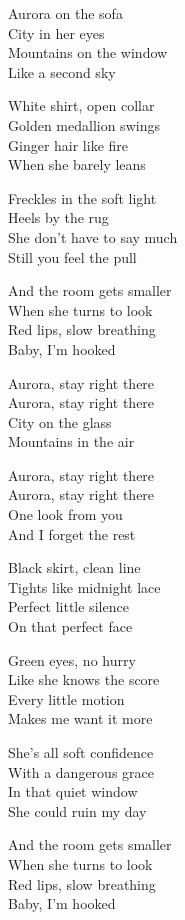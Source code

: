 \begin{lyrics}
Aurora on the sofa\\
City in her eyes\\
Mountains on the window\\
Like a second sky

White shirt, open collar\\
Golden medallion swings\\
Ginger hair like fire\\
When she barely leans

Freckles in the soft light\\
Heels by the rug\\
She don't have to say much\\
Still you feel the pull

And the room gets smaller\\
When she turns to look\\
Red lips, slow breathing\\
Baby, I'm hooked

Aurora, stay right there\\
Aurora, stay right there\\
City on the glass\\
Mountains in the air

Aurora, stay right there\\
Aurora, stay right there\\
One look from you\\
And I forget the rest

Black skirt, clean line\\
Tights like midnight lace\\
Perfect little silence\\
On that perfect face

Green eyes, no hurry\\
Like she knows the score\\
Every little motion\\
Makes me want it more

She’s all soft confidence\\
With a dangerous grace\\
In that quiet window\\
She could ruin my day

And the room gets smaller\\
When she turns to look\\
Red lips, slow breathing\\
Baby, I'm hooked


\end{lyrics}
